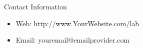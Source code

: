 \documentclass[final]{beamer}
\newlength{\onecolwid}
\begin{document}
\begin{frame}[t]
\begin{columns}[t]
\begin{column}{\onecolwid}






\begin{alertblock}{Contact Information}

\begin{itemize}
\item Web: http://www.YourWebsite.com/lab
\item Email: youremail@emailprovider.com
\end{itemize}

\end{alertblock}


\end{column} %

\end{columns} %

\end{frame} %
\end{document}
